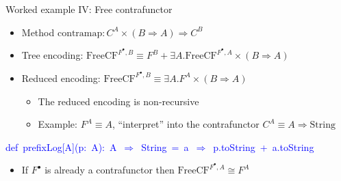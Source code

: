 \documentclass[english,,russian]{beamer}
\newenvironment{lyxcode}
  {\par\begin{list}{}{
    \setlength{\rightmargin}{\leftmargin}
    \setlength{\listparindent}{0pt}%
    \raggedright
    \setlength{\itemsep}{0pt}
    \setlength{\parsep}{0pt}
    \normalfont\ttfamily}%
   \def\{{\char`\{}
   \def\}{\char`\}}
   \def\textasciitilde{\char`\~}
   \item[]}
  {\end{list}}
\begin{document}
\begin{frame}{Worked example IV: Free contrafunctor}
\begin{itemize}
\item Method $\text{contramap}:C^{A}\times\left(B\Rightarrow A\right)\Rightarrow C^{B}$ 
\item Tree encoding: $\text{FreeCF}^{F^{\bullet},B}\equiv F^{B}+\exists A.\text{FreeCF}^{F^{\bullet},A}\times\left(B\Rightarrow A\right)$
\item Reduced encoding: $\text{FreeCF}^{F^{\bullet},B}\equiv\exists A.F^{A}\times\left(B\Rightarrow A\right)$
\begin{itemize}
\item The reduced encoding is non-recursive
\item Example: $F^{A}\equiv A$, ``interpret'' into the contrafunctor
$C^{A}\equiv A\Rightarrow\text{String}$
\end{itemize}
\end{itemize}
\begin{lyxcode}
{\footnotesize{}\vspace{-0.35cm}}\textcolor{blue}{\footnotesize{}def~prefixLog{[}A{]}(p:~A):~A~$\Rightarrow$~String~=~a~$\Rightarrow$~p.toString~+~a.toString}{\footnotesize\par}
\end{lyxcode}
\begin{itemize}
\item If $F^{\bullet}$ is already a contrafunctor then $\text{FreeCF}^{F^{\bullet},A}\cong F^{A}$
\end{itemize}
\end{frame}
\end{document}
